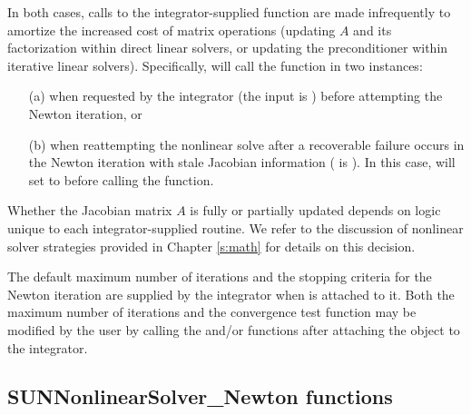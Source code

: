 In both cases, calls to the integrator-supplied 
function are made infrequently to amortize the increased cost of
matrix operations (updating $A$ and its factorization within direct
linear solvers, or updating the preconditioner within iterative linear
solvers).  Specifically, {\sunnonlinsolnewton} will call the
 function in two instances:
\begin{itemize}
\item[(a)] when requested by the integrator (the input
   is ) before attempting the Newton
  iteration, or
\item[(b)] when reattempting the nonlinear solve after a recoverable
  failure occurs in the Newton iteration with stale Jacobian
  information ( is ).  In this case,
  {\sunnonlinsolnewton} will set  to  before
  calling the  function.
\end{itemize}
Whether the Jacobian matrix $A$ is fully or partially updated depends
on logic unique to each integrator-supplied 
routine. We refer to the discussion of nonlinear solver strategies
provided in Chapter \ref{s:math} for details on this decision.

The default maximum number of iterations and the stopping criteria for
the Newton iteration are supplied by the {\sundials} integrator when
{\sunnonlinsolnewton} is attached to it.  Both the maximum number of
iterations and the convergence test function may be modified by the
user by calling the  and/or
 functions after attaching the
{\sunnonlinsolnewton} object to the integrator.

\subsection{SUNNonlinearSolver\_Newton functions}
\label{ss:sunnonlinsolnewton_functions}

